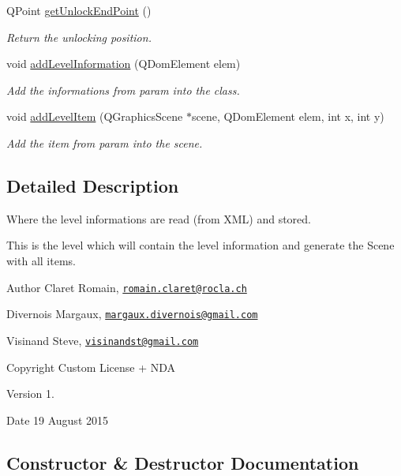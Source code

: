 \begin{DoxyCompactItemize}
Q\+Point \hyperlink{class_g___level_a78fe48953fdd7e137c8282d4bc48f5f2}{get\+Unlock\+End\+Point} ()
\begin{DoxyCompactList}\small\item\em Return the unlocking position. \end{DoxyCompactList}\item 
void \hyperlink{class_g___level_a4f3a07d032accbb59bb7a9db39940f7f}{add\+Level\+Information} (Q\+Dom\+Element elem)
\begin{DoxyCompactList}\small\item\em Add the informations from param into the class. \end{DoxyCompactList}\item 
void \hyperlink{class_g___level_a7f20bfd85286d75b9a4ff2ba57f5623e}{add\+Level\+Item} (Q\+Graphics\+Scene $\ast$scene, Q\+Dom\+Element elem, int x, int y)
\begin{DoxyCompactList}\small\item\em Add the item from param into the scene. \end{DoxyCompactList}\end{DoxyCompactItemize}


\subsection{Detailed Description}
Where the level informations are read (from X\+M\+L) and stored. 

This is the level which will contain the level information and generate the Scene with all items. \begin{DoxyAuthor}{Author}
Claret Romain, \href{mailto:romain.claret@rocla.ch}{\tt romain.\+claret@rocla.\+ch} 

Divernois Margaux, \href{mailto:margaux.divernois@gmail.com}{\tt margaux.\+divernois@gmail.\+com} 

Visinand Steve, \href{mailto:visinandst@gmail.com}{\tt visinandst@gmail.\+com} 
\end{DoxyAuthor}
\begin{DoxyCopyright}{Copyright}
Custom License + N\+D\+A 
\end{DoxyCopyright}
\begin{DoxyVersion}{Version}
1. 
\end{DoxyVersion}
\begin{DoxyDate}{Date}
19 August 2015 
\end{DoxyDate}


\subsection{Constructor \& Destructor Documentation}
\hypertarget{class_g___level_a38ac069cc3b5490988f71aad58442581}{}
